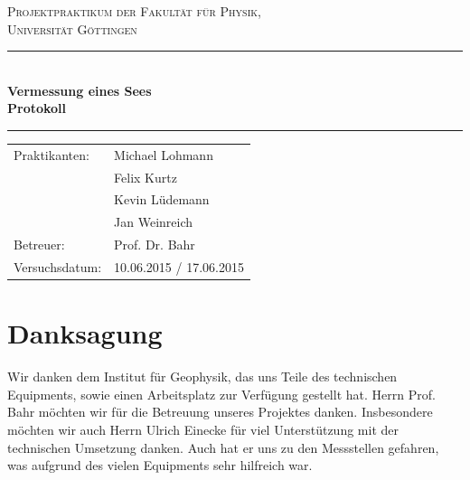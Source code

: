 \documentclass[12pt,a4paper,titlepage,headinclude,bibtotoc]{scrartcl}
\numberwithin{equation}{subsection}
\newenvironment{bottom}{\par\vspace*{\fill}}{\clearpage}
\begin{document}
\begin{titlepage}
\centering
\textsc{\Large Projektpraktikum der Fakultät für
  Physik,\\[1ex] Universität Göttingen}

\vspace*{2cm}

\rule{\textwidth}{1pt}\\[0.5cm]
{\huge \bfseries
  Vermessung eines Sees \\[1ex]
  Protokoll}\\[0.5cm]
\rule{\textwidth}{1pt}

\vspace*{2cm}

\begin{Large}
\begin{tabular}{ll}
Praktikanten: &  Michael Lohmann\\
 &  Felix Kurtz\\
 &  Kevin Lüdemann\\
 &  Jan Weinreich\\
 Betreuer: & Prof. Dr. Bahr\\
 Versuchsdatum: & 10.06.2015 / 17.06.2015\\
\end{tabular}
\end{Large}

\vspace*{3.8cm}

\begin{Large}
\end{Large}

\end{titlepage}
\thispagestyle{empty}
\tableofcontents
\thispagestyle{empty}
\begin{bottom}
\section*{Danksagung}
Wir danken dem Institut für Geophysik, das uns Teile des technischen Equipments, sowie einen Arbeitsplatz zur Verfügung gestellt hat.
Herrn Prof. Bahr möchten wir für die Betreuung unseres Projektes danken.
Insbesondere möchten wir auch Herrn Ulrich Einecke für viel Unterstützung mit der technischen Umsetzung danken.
Auch hat er uns zu den Messstellen gefahren, was aufgrund des vielen Equipments sehr hilfreich war.
\end{bottom}
\newpage
\end{document}
